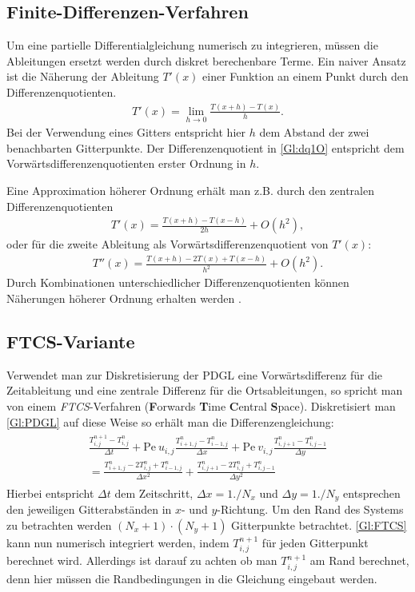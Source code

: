 \subsection{Finite-Differenzen-Verfahren}
Um eine partielle Differentialgleichung numerisch zu integrieren, müssen die Ableitungen ersetzt werden durch diskret berechenbare Terme.
Ein naiver Ansatz ist die Näherung der Ableitung $T'(x)$ einer Funktion an einem Punkt durch den Differenzenquotienten.
\begin{align}
  T'(x) = \lim_{h\rightarrow 0}\frac{T(x+h)-T(x)}{h}.\label{Gl:dq1O}
\end{align}
Bei der Verwendung eines Gitters entspricht hier $h$ dem Abstand der zwei benachbarten Gitterpunkte.
Der Differenzenquotient in \cref{Gl:dq1O} entspricht dem Vorwärtsdifferenzenquotienten erster Ordnung in $h$.

Eine Approximation höherer Ordnung erhält man z.B. durch den zentralen Differenzenquotienten
\begin{align}
  T'(x) = \frac{T(x+h)-T(x-h)}{2h} + O(h^2),\label{Gl:dq2O}
\end{align}
oder für die zweite Ableitung als Vorwärtsdifferenzenquotient von $T'(x)$:
\begin{align}
  T''(x) = \frac{T(x+h)-2T(x)+T(x-h)}{h^2}+O(h^2).\label{Gl:dq2O2Abl}
\end{align}
Durch Kombinationen unterschiedlicher Differenzenquotienten können Näherungen höherer Ordnung erhalten werden \cite{numstr}.
\subsection{FTCS-Variante}
Verwendet man zur Diskretisierung der PDGL eine Vorwärtsdifferenz für die Zeitableitung und eine zentrale Differenz für die Ortsableitungen, so spricht man von einem \emph{FTCS}-Verfahren (\textbf{F}orwards \textbf{T}ime \textbf{C}entral \textbf{S}pace).
Diskretisiert man \cref{Gl:PDGL} auf diese Weise so erhält man die Differenzengleichung:
\begin{align}
  \begin{split}
  \frac{T^{n+1}_{i,j}-T^{n}_{i,j}}{\Delta t} + \text{Pe}~ u_{i,j} \frac{T^{n}_{i+1,j}-T^{n}_{i-1,j}}{\Delta x} + \text{Pe}~ v_{i,j} \frac{T^{n}_{i,j+1}-T^{n}_{i,j-1}}{\Delta y}\\
   =  \frac{T^{n}_{i+1,j}-2T^{n}_{i,j}+T^{n}_{i-1,j}}{\Delta x^2} +\frac{T^{n}_{i,j+1}-2T^{n}_{i,j}+T^{n}_{i,j-1}}{\Delta y^2}
 \end{split}\label{Gl:FTCS}
\end{align}
Hierbei entspricht $\Delta t$ dem Zeitschritt, $\Delta x = 1./N_x$ und $\Delta y = 1./N_y$ entsprechen den jeweiligen Gitterabständen in $x$- und $y$-Richtung.
Um den Rand des Systems zu betrachten werden $(N_x+1) \cdot (N_y+1)$ Gitterpunkte betrachtet.
\cref{Gl:FTCS} kann nun numerisch integriert werden, indem $T^{n+1}_{i,j}$ für jeden Gitterpunkt berechnet wird.
Allerdings ist darauf zu achten ob man $T^{n+1}_{i,j}$ am Rand berechnet, denn hier müssen die Randbedingungen in die Gleichung eingebaut werden.

